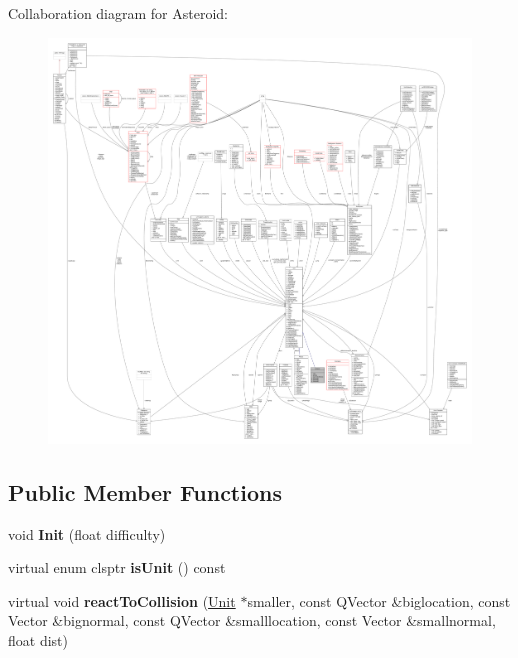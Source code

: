 Collaboration diagram for Asteroid\+:
\nopagebreak
\begin{figure}[H]
\begin{center}
\leavevmode
\includegraphics[width=350pt]{dd/d5b/classAsteroid__coll__graph}
\end{center}
\end{figure}
\subsection*{Public Member Functions}
\begin{DoxyCompactItemize}
\item 
void {\bfseries Init} (float difficulty)\hypertarget{classAsteroid_af73bfdbf8f0b85636055dbea060df60a}{}\label{classAsteroid_af73bfdbf8f0b85636055dbea060df60a}

\item 
virtual enum clsptr {\bfseries is\+Unit} () const \hypertarget{classAsteroid_a970f126a40dd6eace4ee107a3efd2ab3}{}\label{classAsteroid_a970f126a40dd6eace4ee107a3efd2ab3}

\item 
virtual void {\bfseries react\+To\+Collision} (\hyperlink{classUnit}{Unit} $\ast$smaller, const Q\+Vector \&biglocation, const Vector \&bignormal, const Q\+Vector \&smalllocation, const Vector \&smallnormal, float dist)\hypertarget{classAsteroid_a7c1faad0b6b4e49f61cfab75fee7b641}{}\label{classAsteroid_a7c1faad0b6b4e49f61cfab75fee7b641}

\end{DoxyCompactItemize}
